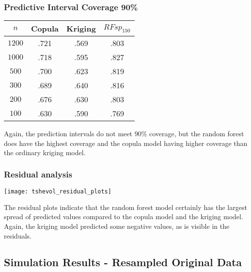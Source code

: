 \documentclass{article}
\begin{document}
\subsubsection{Predictive Interval Coverage 90\%}
\begin{center}
\begin{tabular}{|| c | c c c ||}
\hline
$n$ & Copula & Kriging & $RFsp_{150}$ \\ [.5ex] 
\hline\hline
	$1200$ & .721 & .569 & .803 \\
	$1000$ & .718 & .595 & .827 \\
	$500$ & .700 & .623 & .819 \\
	$300$ & .689 & .640 & .816 \\
	$200$ & .676 & .630 & .803 \\
	$100$ & .630 & .590 & .769 \\ [.5ex] 
\hline
\end{tabular}
\end{center}
Again, the prediction intervals do not meet 90\% coverage, but the random forest does have the highest coverage and the copula model having higher coverage than the ordinary kriging model.

\subsubsection{Residual analysis}
\begin{center}
\texttt{[image: tshevol\_residual\_plots]}
\end{center}
The residual plots indicate that the random forest model certainly has the largest spread of predicted values compared to the copula model and the kriging model.
Again, the kriging model predicted some negative values, as is visible in the residuals.

\subsection{Simulation Results - Resampled Original Data}
\end{document}
